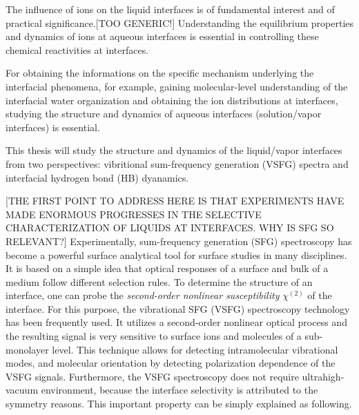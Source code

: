The influence of ions on the liquid interfaces is of fundamental interest and of practical significance.[TOO GENERIC!] 
Understanding the equilibrium properties and dynamics of ions at
aqueous interfaces is essential in controlling these chemical reactivities at interfaces.


For obtaining the informations on the specific mechanism underlying the interfacial phenomena, for example,
gaining molecular-level understanding of the interfacial water organization and obtaining the ion distributions at interfaces,
studying the structure and dynamics of aqueous interfaces (solution/vapor interfaces) is essential.








This thesis will study the structure and dynamics of the liquid/vapor interfaces from two perspectives: 
vibritional sum-frequency generation (VSFG) spectra and interfacial hydrogen bond (HB) dyanamics.
 
[THE FIRST POINT TO ADDRESS HERE IS THAT EXPERIMENTS HAVE MADE ENORMOUS PROGRESSES IN THE SELECTIVE CHARACTERIZATION OF LIQUIDS AT INTERFACES. WHY IS SFG SO RELEVANT?]
Experimentally, sum-frequency generation (SFG) spectroscopy has become a powerful surface analytical tool 
for surface studies in many disciplines\cite{Shen2016,Morita2018,Shen2020}. 
It is based on a simple idea that optical responses of a surface and bulk of a medium follow different selection rules.
To determine the structure of an interface, one can probe the \emph{second-order nonlinear susceptibility} $\chi^{(2)}$ of 
the interface\cite{Shen84,Guyot-Sionnest1986,Shen2020}.
For this purpose, the vibrational SFG (VSFG) spectroscopy technology has been frequently used.
It utilizes a second-order nonlinear optical process and the resulting signal is very sensitive to surface ions and 
molecules of a sub-monolayer level\cite{Morita2008,WangHongFei2015,WenYuChieh2016,Ishiyama2017,Penalber-Johnstone2018}. 
This technique allows for detecting intramolecular vibrational modes, and molecular orientation by detecting polarization dependence of the VSFG signals\cite{Vidal05}.  
Furthermore, the VSFG spectroscopy does not require ultrahigh-vacuum environment,
because the interface selectivity is attributed to the symmetry reasons\cite{WeiX02,Morita2018}.
This important property can be simply explained as following.

